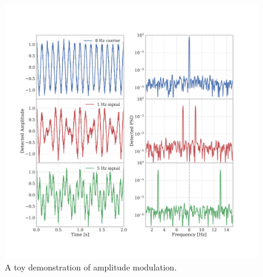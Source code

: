 \begin{figure}[!t]
    \centering
    \includegraphics[width=0.7\linewidth, trim=5cm 5cm 5cm 5cm, clip]{PolarizationModulation/Figures/amplitude_modulation_demo.pdf}
    \caption{A toy demonstration of amplitude modulation.}
    \label{fig:amplitude_modulation}
\end{figure}

